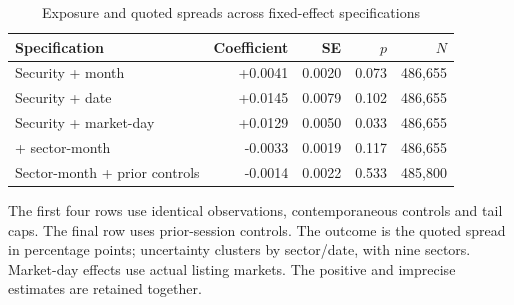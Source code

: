 \begin{table}[htbp]\centering\footnotesize
\caption{Exposure and quoted spreads across fixed-effect specifications}
\label{tab:v2_core}
\begin{threeparttable}\begin{tabular}{l r r r r}\toprule
Specification & Coefficient & SE & $p$ & $N$ \\\midrule
Security + month & +0.0041 & 0.0020 & 0.073 & 486,655 \\
Security + date & +0.0145 & 0.0079 & 0.102 & 486,655 \\
Security + market-day & +0.0129 & 0.0050 & 0.033 & 486,655 \\
+ sector-month & -0.0033 & 0.0019 & 0.117 & 486,655 \\
Sector-month + prior controls & -0.0014 & 0.0022 & 0.533 & 485,800 \\
\bottomrule\end{tabular}
\begin{tablenotes}\small\item The first four rows use identical observations, contemporaneous controls and tail caps. The final row uses prior-session controls. The outcome is the quoted spread in percentage points; uncertainty clusters by sector/date, with nine sectors. Market-day effects use actual listing markets. The positive and imprecise estimates are retained together.\end{tablenotes}
\end{threeparttable}\end{table}
